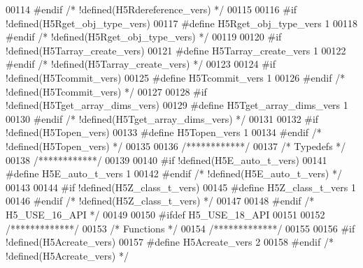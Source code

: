 \begin{DoxyCode}
00114 \textcolor{preprocessor}{#endif }\textcolor{comment}{/* !defined(H5Rdereference\_vers) */}\textcolor{preprocessor}{}
00115 
00116 \textcolor{preprocessor}{#if !defined(H5Rget\_obj\_type\_vers)}
00117 \textcolor{preprocessor}{  #define H5Rget\_obj\_type\_vers 1}
00118 \textcolor{preprocessor}{#endif }\textcolor{comment}{/* !defined(H5Rget\_obj\_type\_vers) */}\textcolor{preprocessor}{}
00119 
00120 \textcolor{preprocessor}{#if !defined(H5Tarray\_create\_vers)}
00121 \textcolor{preprocessor}{  #define H5Tarray\_create\_vers 1}
00122 \textcolor{preprocessor}{#endif }\textcolor{comment}{/* !defined(H5Tarray\_create\_vers) */}\textcolor{preprocessor}{}
00123 
00124 \textcolor{preprocessor}{#if !defined(H5Tcommit\_vers)}
00125 \textcolor{preprocessor}{  #define H5Tcommit\_vers 1}
00126 \textcolor{preprocessor}{#endif }\textcolor{comment}{/* !defined(H5Tcommit\_vers) */}\textcolor{preprocessor}{}
00127 
00128 \textcolor{preprocessor}{#if !defined(H5Tget\_array\_dims\_vers)}
00129 \textcolor{preprocessor}{  #define H5Tget\_array\_dims\_vers 1}
00130 \textcolor{preprocessor}{#endif }\textcolor{comment}{/* !defined(H5Tget\_array\_dims\_vers) */}\textcolor{preprocessor}{}
00131 
00132 \textcolor{preprocessor}{#if !defined(H5Topen\_vers)}
00133 \textcolor{preprocessor}{  #define H5Topen\_vers 1}
00134 \textcolor{preprocessor}{#endif }\textcolor{comment}{/* !defined(H5Topen\_vers) */}\textcolor{preprocessor}{}
00135 
00136 \textcolor{comment}{/************/}
00137 \textcolor{comment}{/* Typedefs */}
00138 \textcolor{comment}{/************/}
00139 
00140 \textcolor{preprocessor}{#if !defined(H5E\_auto\_t\_vers)}
00141 \textcolor{preprocessor}{  #define H5E\_auto\_t\_vers 1}
00142 \textcolor{preprocessor}{#endif }\textcolor{comment}{/* !defined(H5E\_auto\_t\_vers) */}\textcolor{preprocessor}{}
00143 
00144 \textcolor{preprocessor}{#if !defined(H5Z\_class\_t\_vers)}
00145 \textcolor{preprocessor}{  #define H5Z\_class\_t\_vers 1}
00146 \textcolor{preprocessor}{#endif }\textcolor{comment}{/* !defined(H5Z\_class\_t\_vers) */}\textcolor{preprocessor}{}
00147 
00148 \textcolor{preprocessor}{#endif }\textcolor{comment}{/* H5\_USE\_16\_API */}\textcolor{preprocessor}{}
00149 
00150 \textcolor{preprocessor}{#ifdef H5\_USE\_18\_API}
00151 
00152 \textcolor{comment}{/*************/}
00153 \textcolor{comment}{/* Functions */}
00154 \textcolor{comment}{/*************/}
00155 
00156 \textcolor{preprocessor}{#if !defined(H5Acreate\_vers)}
00157 \textcolor{preprocessor}{  #define H5Acreate\_vers 2}
00158 \textcolor{preprocessor}{#endif }\textcolor{comment}{/* !defined(H5Acreate\_vers) */}\textcolor{preprocessor}{}

\end{DoxyCode}
